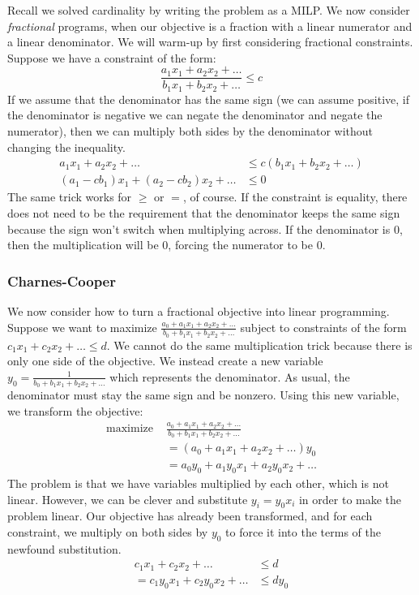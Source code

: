 \documentclass[11pt, oneside]{article}
\theoremstyle{plain}
\theoremstyle{definition}
\begin{document}
Recall we solved cardinality by writing the problem as a MILP. We now consider
\textit{fractional} programs, when our objective is a fraction with a linear
numerator and a linear denominator. We will warm-up by first considering
fractional constraints. Suppose we have a constraint of the form:
\[ \frac{a_1 x_1 + a_2 x_2 + \dots}{b_1 x_1 + b_2 x_2 + \dots} \leq c \]
If we assume that the denominator has the same sign (we can assume positive,
if the denominator is negative we can negate the denominator and negate the
numerator), then we can multiply both sides by the denominator without changing
the inequality.
\begin{align*}
  a_1 x_1 + a_2 x_2 + \dots &\leq c(b_1 x_1 + b_2 x_2 + \dots) \\
  (a_1 - c b_1) x_1 + (a_2 - c b_2) x_2 + \dots & \leq 0
\end{align*}
The same trick works for \( \geq \) or \( = \), of course. If the
constraint is equality, there does not need to be the requirement
that the denominator keeps the same sign because the sign won't
switch when multiplying across. If the denominator is 0, then the
multiplication will be 0, forcing the numerator to be 0.

\subsubsection{Charnes-Cooper}
We now consider how to turn a fractional objective into linear programming.
Suppose we want to maximize \( \frac{a_0 + a_1 x_1 + a_2 x_2 + \dots}{b_0 + b_1
x_1 + b_2 x_2 + \dots} \) subject to constraints of the form \( c_1 x_1 + c_2
x_2 + \dots \leq d \). We cannot do the same multiplication trick because there
is only one side of the objective. We instead create a new variable \( y_0 =
\frac{1}{b_0 + b_1 x_1 + b_2 x_2 + \dots} \) which represents the denominator.
As usual, the denominator must stay the same sign and be nonzero. Using this
new variable, we transform the objective:
\begin{align*} 
  \text{maximize }
  &\frac{a_0 + a_1 x_1 + a_2 x_2 + \dots}{b_0 + b_1 x_1 + b_2x_2 + \dots} \\
  &= (a_0 + a_1 x_1 + a_2 x_2 + \dots) y_0 \\
  &= a_0 y_0 + a_1 y_0 x_1 + a_2 y_0 x_2 + \dots
\end{align*}
The problem is that we have variables multiplied by each other, which
is not linear. However, we can be clever and substitute \( y_i = y_0
x_i \) in order to make the problem linear. Our objective has already
been transformed, and for each constraint, we multiply on both sides by
\( y_0 \) to force it into the terms of the newfound substitution.
\begin{align*}
  c_1 x_1 + c_2x_2 + \dots &\leq d  \\
  = c_1 y_0 x_1 + c_2 y_0 x_2 + \dots &\leq d y_0 
\end{align*}
\end{document}
